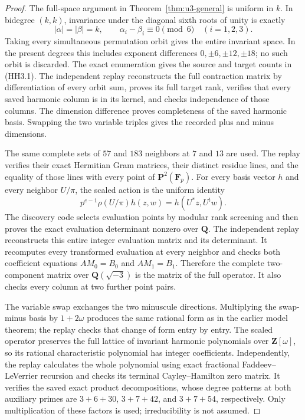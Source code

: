 \documentclass[11pt,a4paper]{article}
\theoremstyle{definition}
\begin{document}
\begin{proof}
The full-space argument in Theorem~\ref{thm:u3-general} is
uniform in \(k\). In bidegree \((k,k)\), invariance under the
diagonal sixth roots of unity is exactly
\[
 |\alpha|=|\beta|=k,\qquad
 \alpha_i-\beta_i\equiv0\pmod6\quad(i=1,2,3).
 \tag{HH3.5}
\]
Taking every simultaneous permutation orbit gives the entire
invariant space. In the present degrees this includes exponent
differences \(0,\pm6,\pm12,\pm18\); no such orbit is discarded.
The exact enumeration gives the source and target counts in
(HH3.1). The independent replay reconstructs the full contraction
matrix by differentiation of every orbit sum, proves its full
target rank, verifies that every saved harmonic column is in
its kernel, and checks independence of those columns. The
dimension difference proves completeness of the saved harmonic
basis. Swapping the two variable triples gives the recorded
plus and minus dimensions.

The same complete sets of \(57\) and \(183\) neighbors at \(7\)
and \(13\) are used. The replay verifies their exact Hermitian
Gram matrices, their distinct residue lines, and the equality
of those lines with every point of \(\mathbf P^2(\mathbf F_p)\).
For every basis vector \(h\) and every neighbor \(U/\pi\),
the scaled action is the uniform identity
\[
 p^{e-1}\rho(U/\pi)h(z,w)=h(U^*z,U^tw).
 \tag{HH3.6}
\]
The discovery code selects evaluation points by modular rank
screening and then proves the exact evaluation determinant
nonzero over \(\mathbf Q\). The independent replay reconstructs
this entire integer evaluation matrix and its determinant.
It recomputes every transformed evaluation at every neighbor
and checks both coefficient equations \(AM_0=B_0\) and
\(AM_1=B_1\). Therefore the complete two-component matrix over
\(\mathbf Q(\sqrt{-3})\) is the matrix of the full operator.
It also checks every column at two further point pairs.

The variable swap exchanges the two minuscule directions.
Multiplying the swap-minus basis by \(1+2\omega\) produces
the same rational form as in the earlier model theorem; the
replay checks that change of form entry by entry. The scaled
operator preserves the full lattice of invariant harmonic
polynomials over \(\mathbf Z[\omega]\), so its rational
characteristic polynomial has integer coefficients.
Independently, the replay calculates the whole polynomial
using exact fractional Faddeev--LeVerrier recursion and
checks its terminal Cayley--Hamilton zero matrix. It verifies
the saved exact product decompositions, whose degree patterns
at both auxiliary primes are \(3+6+30\), \(3+7+42\), and
\(3+7+54\), respectively. Only multiplication of these factors
is used; irreducibility is not assumed.


\end{proof}
\end{document}
